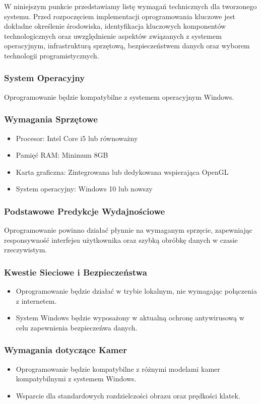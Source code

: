 W niniejszym punkcie przedstawiamy listę wymagań technicznych dla tworzonego systemu. 
Przed rozpoczęciem implementacji oprogramowania kluczowe jest dokładne określenie środowiska, 
identyfikacja kluczowych komponentów technologicznych oraz uwzględnienie aspektów związanych 
z systemem operacyjnym, infrastrukturą sprzętową, bezpieczeństwem danych oraz wyborem 
technologii programistycznych.

\subsubsection*{System Operacyjny}
Oprogramowanie będzie kompatybilne z systemem operacyjnym Windows.

\subsubsection*{Wymagania Sprzętowe} %
\begin{itemize}
    \item Procesor: Intel Core i5 lub równoważny
    \item Pamięć RAM: Minimum 8GB
    \item Karta graficzna: Zintegrowana lub dedykowana wspierająca OpenGL %
    \item System operacyjny: Windows 10 lub nowszy
\end{itemize}

\subsubsection*{Podstawowe Predykcje Wydajnościowe}
Oprogramowanie powinno działać płynnie na wymaganym sprzęcie, zapewniając responsywność 
interfejsu użytkownika oraz szybką obróbkę danych w czasie rzeczywistym.

\subsubsection*{Kwestie Sieciowe i Bezpieczeństwa}
\begin{itemize}
    \item Oprogramowanie będzie działać w trybie lokalnym, nie wymagając połączenia z internetem.
    \item System Windows będzie wyposażony w aktualną ochronę antywirusową w celu zapewnienia bezpieczeńwa danych.
\end{itemize}

\subsubsection*{Wymagania dotyczące Kamer}
\begin{itemize}
    \item Oprogramowanie będzie kompatybilne z różnymi modelami kamer kompatybilnymi z systemem Windows.
    \item Wsparcie dla standardowych rozdzielczości obrazu oraz prędkości klatek.
\end{itemize}

